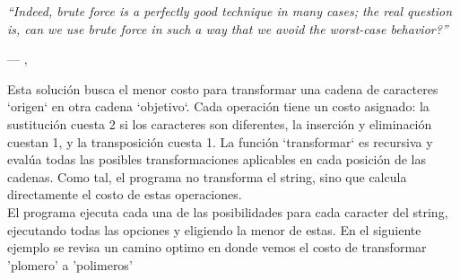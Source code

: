 \epigraph{\textit{``Indeed, brute force is a perfectly good technique in many cases; the real question is, can we use brute force in such a way that we avoid the worst-case behavior?''}}{--- \citeauthor{taocv3}, \citeyear{taocv3} \cite{taocv3}}
Esta solución busca el menor costo para transformar una cadena de caracteres `origen` en otra cadena `objetivo`. Cada operación tiene un costo asignado: la sustitución cuesta 2 si los caracteres son diferentes, la inserción y eliminación cuestan 1, y la transposición cuesta 1. La función `transformar` es recursiva y evalúa todas las posibles transformaciones aplicables en cada posición de las cadenas. Como tal, el programa no transforma el string, sino que calcula directamente el costo de estas operaciones.
\\
El programa ejecuta cada una de las posibilidades para cada caracter del string, ejecutando todas las opciones y eligiendo la menor de estas. En el siguiente ejemplo se revisa un camino optimo en donde vemos el costo de transformar 'plomero' a 'polimeros'

\vspace{1em} %

